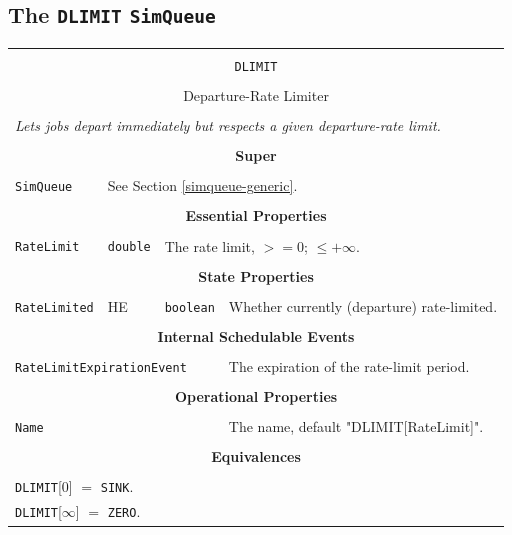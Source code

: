 \documentclass[12pt]{book}
\begin{document}
\subsection{The \lstinline{DLIMIT} \lstinline{SimQueue}}

\begin{tabular}{|l|l|l|l|}
\hline
\multicolumn{4}{|c|}{} \\
\multicolumn{4}{|c|}{\lstinline[basicstyle=\large]{DLIMIT}} \\
\multicolumn{4}{|c|}{} \\
\multicolumn{4}{|c|}{Departure-Rate Limiter} \\
\multicolumn{4}{|c|}{} \\
\hline
\multicolumn{4}{|l|}{\em Lets jobs depart immediately but respects a given departure-rate limit.} \\
\hline
\multicolumn{4}{|c|}{} \\
\multicolumn{4}{|c|}{\bf Super} \\
\multicolumn{4}{|c|}{} \\
\hline
\lstinline|SimQueue| & \multicolumn{3}{|l|}{See Section \ref{simqueue-generic}.} \\
\hline
\multicolumn{4}{|c|}{} \\
\multicolumn{4}{|c|}{\bf Essential Properties} \\
\multicolumn{4}{|c|}{} \\
\hline
\lstinline|RateLimit| & \lstinline|double| & \multicolumn{2}{|l|}{The rate limit, $>= 0$; $\leq +\infty$.} \\
\hline
\multicolumn{4}{|c|}{} \\
\multicolumn{4}{|c|}{\bf State Properties} \\
\multicolumn{4}{|c|}{} \\
\hline
\lstinline|RateLimited| & HE & \lstinline|boolean| & Whether currently (departure) rate-limited. \\
\hline
\multicolumn{4}{|c|}{} \\
\multicolumn{4}{|c|}{\bf Internal Schedulable Events} \\
\multicolumn{4}{|c|}{} \\
\hline
\multicolumn{3}{|l|}{\lstinline|RateLimitExpirationEvent|} & The expiration of the rate-limit period. \\
\hline
\multicolumn{4}{|c|}{} \\
\multicolumn{4}{|c|}{\bf Operational Properties} \\
\multicolumn{4}{|c|}{} \\
\hline
\multicolumn{3}{|l|}{\lstinline|Name|} & The name, default "DLIMIT[RateLimit]". \\
\hline
\multicolumn{4}{|c|}{} \\
\multicolumn{4}{|c|}{\bf Equivalences} \\
\multicolumn{4}{|c|}{} \\
\hline
\multicolumn{4}{|l|}{\lstinline|DLIMIT|[$0$] $=$ \lstinline|SINK|.} \\
\multicolumn{4}{|l|}{\lstinline|DLIMIT|[$\infty$] $=$ \lstinline|ZERO|.} \\
\hline
\end{tabular}
\end{document}
